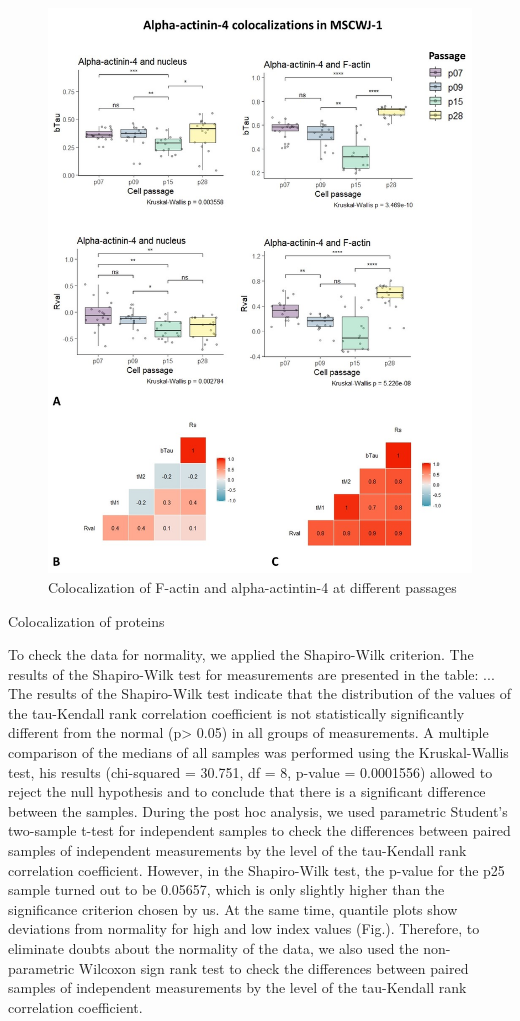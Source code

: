 \documentclass[english,authoryear]{elsarticle}
\begin{document}
\begin{figure}[hbt!]
\centering
\includegraphics[width=0.9\linewidth]{fig_a4-actin-col.jpg}
\caption{Colocalization of F-actin and alpha-actintin-4 at different passages}
\label{a4-actin-col}
\end{figure}

Colocalization of proteins


To check the data for normality, we applied the Shapiro-Wilk criterion.
The results of the Shapiro-Wilk test for measurements are presented in the table:
...
The results of the Shapiro-Wilk test indicate that the distribution of the values of the tau-Kendall rank correlation coefficient is not statistically significantly different from the normal (p> 0.05) in all groups of measurements. A multiple comparison of the medians of all samples was performed using the Kruskal-Wallis test, his results (chi-squared = 30.751, df = 8, p-value = 0.0001556) allowed to reject the null hypothesis and to conclude that there is a significant difference between the samples.
 During the post hoc analysis, we used parametric Student’s two-sample t-test for independent samples to check the differences between paired samples of independent measurements by the level of the tau-Kendall rank correlation coefficient.
However, in the Shapiro-Wilk test, the p-value for the p25 sample turned out to be 0.05657, which is only slightly higher than the significance criterion chosen by us. At the same time, quantile plots show deviations from normality for high and low index values (Fig.).
Therefore, to eliminate doubts about the normality of the data, we also used the non-parametric Wilcoxon sign rank test to check the differences between paired samples of independent measurements by the level of the tau-Kendall rank correlation coefficient.
\end{document}
